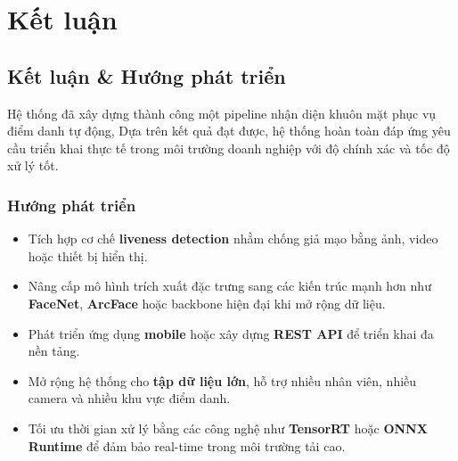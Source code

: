 \documentclass[a4paper]{book}
\begin{document}
\chapter{Kết luận}

\section{Kết luận \& Hướng phát triển}

Hệ thống đã xây dựng thành công một pipeline nhận diện khuôn mặt phục vụ điểm danh tự động, 
Dựa trên kết quả đạt được, hệ thống hoàn toàn đáp ứng yêu cầu triển khai thực tế trong môi trường doanh nghiệp với độ chính xác và tốc độ xử lý tốt.

\subsection*{Hướng phát triển}
\begin{itemize}
    \item Tích hợp cơ chế \textbf{liveness detection} nhằm chống giả mạo bằng ảnh, video hoặc thiết bị hiển thị.
    \item Nâng cấp mô hình trích xuất đặc trưng sang các kiến trúc mạnh hơn như \textbf{FaceNet}, \textbf{ArcFace} hoặc backbone hiện đại khi mở rộng dữ liệu.
    \item Phát triển ứng dụng \textbf{mobile} hoặc xây dựng \textbf{REST API} để triển khai đa nền tảng.
    \item Mở rộng hệ thống cho \textbf{tập dữ liệu lớn}, hỗ trợ nhiều nhân viên, nhiều camera và nhiều khu vực điểm danh.
    \item Tối ưu thời gian xử lý bằng các công nghệ như \textbf{TensorRT} hoặc \textbf{ONNX Runtime} để đảm bảo real-time trong môi trường tải cao.
\end{itemize}
\end{document}
